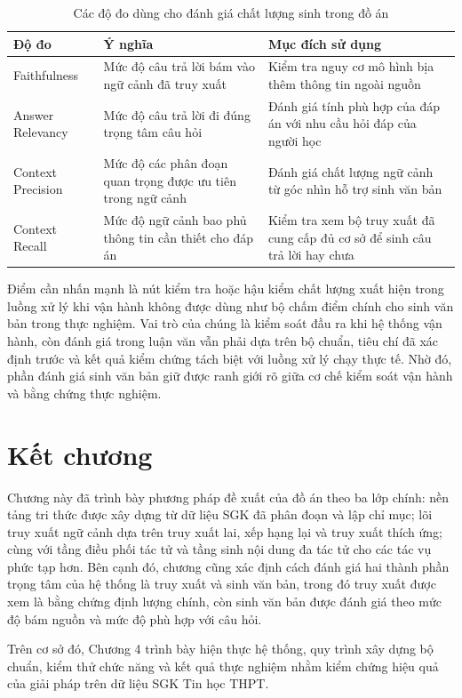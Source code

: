 \documentclass[../DoAn.tex]{subfiles}
\begin{document}
\begin{table}[H]
    \centering
    \renewcommand{\arraystretch}{1.25}
    \begin{tabular}{|p{}|p{}|p{}|}
        \hline
        \textbf{Độ đo} & \textbf{Ý nghĩa} & \textbf{Mục đích sử dụng} \\
        \hline
        Faithfulness & Mức độ câu trả lời bám vào ngữ cảnh đã truy xuất & Kiểm tra nguy cơ mô hình bịa thêm thông tin ngoài nguồn \\
        \hline
        Answer Relevancy & Mức độ câu trả lời đi đúng trọng tâm câu hỏi & Đánh giá tính phù hợp của đáp án với nhu cầu hỏi đáp của người học \\
        \hline
        Context Precision & Mức độ các phân đoạn quan trọng được ưu tiên trong ngữ cảnh & Đánh giá chất lượng ngữ cảnh từ góc nhìn hỗ trợ sinh văn bản \\
        \hline
        Context Recall & Mức độ ngữ cảnh bao phủ thông tin cần thiết cho đáp án & Kiểm tra xem bộ truy xuất đã cung cấp đủ cơ sở để sinh câu trả lời hay chưa \\
        \hline
    \end{tabular}
    \vspace{0.2cm}
    \caption{Các độ đo dùng cho đánh giá chất lượng sinh trong đồ án}
    \label{tab:generation-metrics-method}
\end{table}

Điểm cần nhấn mạnh là nút kiểm tra hoặc hậu kiểm chất lượng xuất hiện trong luồng xử lý khi vận hành không được dùng như bộ chấm điểm chính cho sinh văn bản trong thực nghiệm. Vai trò của chúng là kiểm soát đầu ra khi hệ thống vận hành, còn đánh giá trong luận văn vẫn phải dựa trên bộ chuẩn, tiêu chí đã xác định trước và kết quả kiểm chứng tách biệt với luồng xử lý chạy thực tế. Nhờ đó, phần đánh giá sinh văn bản giữ được ranh giới rõ giữa cơ chế kiểm soát vận hành và bằng chứng thực nghiệm.

\section{Kết chương}

Chương này đã trình bày phương pháp đề xuất của đồ án theo ba lớp chính: nền tảng tri thức được xây dựng từ dữ liệu SGK đã phân đoạn và lập chỉ mục; lõi truy xuất ngữ cảnh dựa trên truy xuất lai, xếp hạng lại và truy xuất thích ứng; cùng với tầng điều phối tác tử và tầng sinh nội dung đa tác tử cho các tác vụ phức tạp hơn. Bên cạnh đó, chương cũng xác định cách đánh giá hai thành phần trọng tâm của hệ thống là truy xuất và sinh văn bản, trong đó truy xuất được xem là bằng chứng định lượng chính, còn sinh văn bản được đánh giá theo mức độ bám nguồn và mức độ phù hợp với câu hỏi.

Trên cơ sở đó, Chương 4 trình bày hiện thực hệ thống, quy trình xây dựng bộ chuẩn, kiểm thử chức năng và kết quả thực nghiệm nhằm kiểm chứng hiệu quả của giải pháp trên dữ liệu SGK Tin học THPT.
\end{document}
